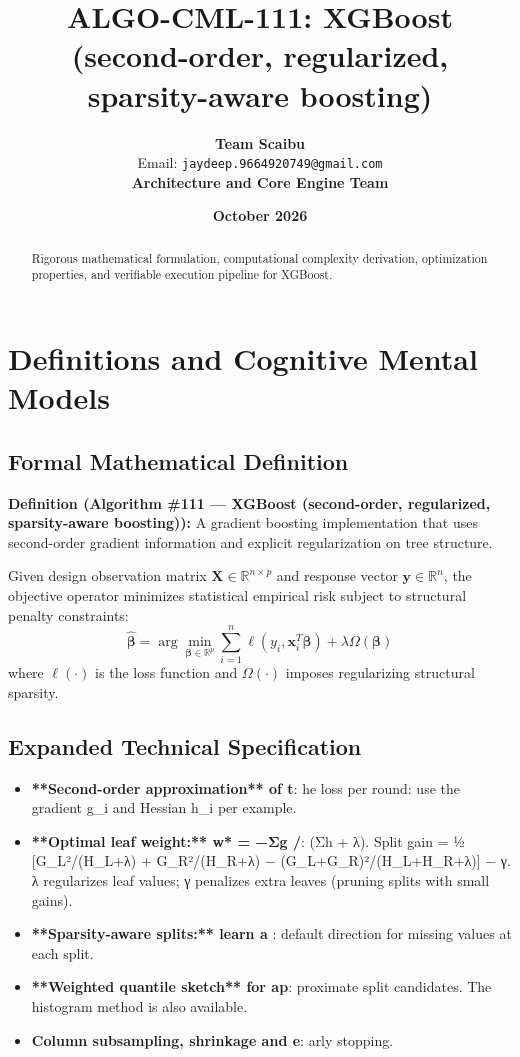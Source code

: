 \documentclass[11pt,a4paper]{article}
\title{\textbf{ALGO-CML-111: XGBoost (second-order, regularized, sparsity-aware boosting)}}
\author{\textbf{Team Scaibu} \\ \small Email: \texttt{jaydeep.9664920749@gmail.com} \\ \small \textbf{Architecture and Core Engine Team}}
\date{\textbf{October 2026}}
\theoremstyle{definition}
\begin{document}
\maketitle

\begin{abstract}
Rigorous mathematical formulation, computational complexity derivation, optimization properties, and verifiable execution pipeline for XGBoost.
\end{abstract}

\section{Definitions and Cognitive Mental Models}

\subsection{Formal Mathematical Definition}
\textbf{Definition (Algorithm \#111 --- XGBoost (second-order, regularized, sparsity-aware boosting)):}
A gradient boosting implementation that uses second-order gradient information and explicit regularization on tree structure.

Given design observation matrix $\mathbf{X} \in \mathbb{R}^{n \times p}$ and response vector $\mathbf{y} \in \mathbb{R}^n$, the objective operator minimizes statistical empirical risk subject to structural penalty constraints:
\begin{equation}
\hat{\boldsymbol{\beta}} = \arg\min_{\boldsymbol{\beta} \in \mathbb{R}^p} \sum_{i=1}^n \ell(y_i, \mathbf{x}_i^T \boldsymbol{\beta}) + \lambda \Omega(\boldsymbol{\beta})
\end{equation}
where $\ell(\cdot)$ is the loss function and $\Omega(\cdot)$ imposes regularizing structural sparsity.

\subsection{Expanded Technical Specification}
\begin{itemize}
\item \textbf{**Second-order approximation** of t}: he loss per round: use the gradient g\_i and Hessian h\_i per example.
\item \textbf{**Optimal leaf weight:** w* = −Σg /}:  (Σh + λ). Split gain = ½ [G\_L²/(H\_L+λ) + G\_R²/(H\_R+λ) − (G\_L+G\_R)²/(H\_L+H\_R+λ)] − γ. λ regularizes leaf values; γ penalizes extra leaves (pruning splits with small gains).
\item \textbf{**Sparsity-aware splits:** learn a }: default direction for missing values at each split.
\item \textbf{**Weighted quantile sketch** for ap}: proximate split candidates. The histogram method is also available.
\item \textbf{Column subsampling, shrinkage and e}: arly stopping.
\end{itemize}
\end{document}
